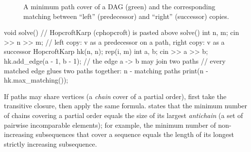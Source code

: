 \begin{figure}[htbp]
\centering
{}
\caption{A minimum path cover of a DAG (green) and the corresponding matching between ``left'' (predecessor) and ``right''
(successor) copies.}
\label{fig:pathcover}
\end{figure}

\begin{code}
void solve() {  // HopcroftKarp (cphopcroft) is pasted above solve()
    int n, m;
    cin >> n >> m;
    // left copy: v as a predecessor on a path, right copy: v as a successor
    HopcroftKarp hk(n, n);
    rep(i, m) {
        int a, b;
        cin >> a >> b;
        hk.add_edge(a - 1, b - 1);  // the edge a -> b may join two paths
    }
    // every matched edge glues two paths together: n - matching paths
    print(n - hk.max_matching());
}
\end{code}

If paths may share vertices (a \emph{chain} cover of a partial order), first take the transitive closure, then apply the same
formula.  states that the minimum number of chains covering a partial order equals the size of its
largest \emph{antichain} (a set of pairwise incomparable elements); for example, the minimum number of non-increasing
subsequences that cover a sequence equals the length of its longest strictly increasing subsequence.

